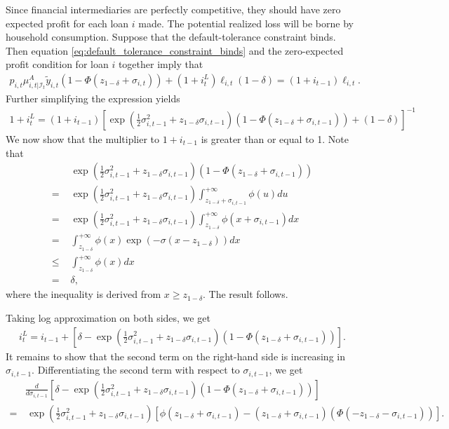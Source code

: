 \documentclass[12pt]{article}
\numberwithin{equation}{section}
\begin{document}
\begin{appendix}
Since financial intermediaries are perfectly competitive, they should have zero expected profit for each loan $i$ made. The potential realized loss will be borne by household consumption. Suppose that the default-tolerance constraint binds. 
Then equation \eqref{eq:default_tolerance_constraint_binds} and the zero-expected profit condition for loan $i$ together imply that
\begin{align*}
    p_{i,t}\mu^A_{i, t|\mathcal{I}_t}\tilde{y}_{i,t}\left(1-\Phi\left(z_{1-\delta}+\sigma_{i,t}\right)\right) + (1+i^L_{t})\ell_{i,t}(1-\delta) = (1+i_{t-1})\ell_{i,t}.
\end{align*}
Further simplifying the expression yields
\begin{align*}
    1 + i^L_{t} = (1+i_{t-1})\left[\exp\left(\frac{1}{2}\sigma^2_{i,t-1}+z_{1-\delta}\sigma_{i,t-1}\right)\left(1-\Phi\left(z_{1-\delta}+\sigma_{i,t-1}\right)\right) + (1-\delta)\right]^{-1}
\end{align*}
We now show that the multiplier to $1+i_{t-1}$ is greater than or equal to 1. Note that
\begin{align*}
    &\exp\left(\frac{1}{2}\sigma^2_{i,t-1}+z_{1-\delta}\sigma_{i,t-1}\right)\left(1-\Phi\left(z_{1-\delta}+\sigma_{i,t-1}\right)\right)\\
    = \,\,&\exp\left(\frac{1}{2}\sigma^2_{i,t-1}+z_{1-\delta}\sigma_{i,t-1}\right) \int^{+\infty}_{z_{1-\delta}+\sigma_{i,t-1}}\phi(u)du\\
    = \,\,&\exp\left(\frac{1}{2}\sigma^2_{i,t-1}+z_{1-\delta}\sigma_{i,t-1}\right) \int^{+\infty}_{z_{1-\delta}}\phi(x+\sigma_{i,t-1})dx\\
    = \,\,&\int^{+\infty}_{z_{1-\delta}}\phi(x) \exp\left(-\sigma(x-z_{1-\delta})\right)dx\\
    \leq \,\,&\int^{+\infty}_{z_{1-\delta}}\phi(x)dx\\
    = \,\,&\delta,
\end{align*}
where the inequality is derived from $x \geq z_{1-\delta}$. The result follows.

Taking log approximation on both sides, we get
\begin{align*}
    i^L_{t} = i_{t-1} + \left[\delta-\exp\left(\frac{1}{2}\sigma^2_{i,t-1}+z_{1-\delta}\sigma_{i,t-1}\right)\left(1-\Phi\left(z_{1-\delta}+\sigma_{i,t-1}\right)\right)\right].
\end{align*}
It remains to show that the second term on the right-hand side is increasing in $\sigma_{i,t-1}$. Differentiating the second term with respect to $\sigma_{i,t-1}$, we get
\begin{align*}
    &\frac{d}{d\sigma_{i,t-1}}\left[\delta-\exp\left(\frac{1}{2}\sigma^2_{i,t-1}+z_{1-\delta}\sigma_{i,t-1}\right)\left(1-\Phi\left(z_{1-\delta}+\sigma_{i,t-1}\right)\right)\right]\\
     = &\,\exp\left(\frac{1}{2}\sigma^2_{i,t-1}+z_{1-\delta}\sigma_{i,t-1}\right)\left[\phi(z_{1-\delta}+\sigma_{i,t-1}) - (z_{1-\delta}+\sigma_{i,t-1})\left(\Phi(-z_{1-\delta}-\sigma_{i,t-1})\right)\right].
\end{align*}


\end{appendix}
\end{document}
